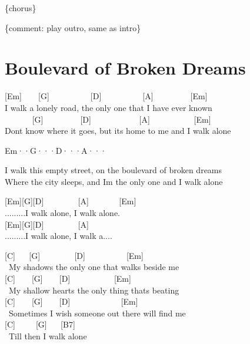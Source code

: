 \documentclass[
  letterpaper,
  twoside=false]{scrbook}
\begin{document}
\{chorus\}

\{comment: play outro, same as intro\}

\hypertarget{boulevard-of-broken-dreams}{%
\chapter{Boulevard of Broken Dreams}\label{boulevard-of-broken-dreams}}

{[}Em{]} ~ ~ {[}G{]} ~ ~ ~ ~ ~ ~{[}D{]} ~ ~ ~ ~ ~ ~{[}A{]} ~ ~ ~ ~ ~
{[}Em{]}\\
I walk a lonely road, the only one that I have ever known\\
\hspace*{0.333em} ~ ~ ~ ~ {[}G{]} ~ ~ ~ ~ ~ {[}D{]} ~ ~ ~ ~ ~ ~ ~{[}A{]}
~ ~ ~ ~ ~ ~ {[}Em{]}\\
Don\textquotesingle t know where it goes, but it\textquotesingle s home
to me and I walk alone

Em··\textbar G···\textbar D···\textbar A···\textbar{}

I walk this empty street, on the boulevard of broken dreams\\
Where the city sleeps, and I\textquotesingle m the only one and I walk
alone

{[}Em{]}{[}G{]}{[}D{]} ~ ~ ~ ~ ~{[}A{]} ~ ~ ~ ~ {[}Em{]}\\
.........I walk alone, I walk alone.\\
{[}Em{]}{[}G{]}{[}D{]} ~ ~ ~ ~ ~{[}A{]}\\
.........I walk alone, I walk a....

{[}C{]} ~ ~{[}G{]} ~ ~ ~ ~ ~{[}D{]} ~ ~ ~ ~ ~ ~{[}Em{]}\\
\hspace*{0.333em} ~My shadow\textquotesingle s the only one that walks
beside me\\
{[}C{]} ~ ~ {[}G{]} ~ ~ {[}D{]} ~ ~ ~ ~ ~ ~ {[}Em{]}\\
\hspace*{0.333em} ~My shallow heart\textquotesingle s the only thing
that\textquotesingle s beating\\
{[}C{]} ~ ~ {[}G{]} ~ ~ {[}D{]} ~ ~ ~ ~ ~ ~ ~ {[}Em{]}\\
\hspace*{0.333em} ~Sometimes I wish someone out there will find me\\
{[}C{]} ~ ~ ~{[}G{]} ~ ~{[}B7{]}\\
\hspace*{0.333em} ~Till then I walk alone
\end{document}

